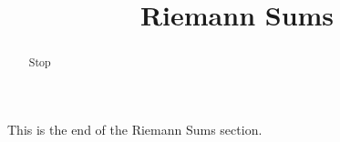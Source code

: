 \documentclass[handout]{ximera}
\title{Riemann Sums}
\begin{document}
\begin{abstract} Stop
\end{abstract}

\maketitle

This is the end of the Riemann Sums section.
\end{document}
